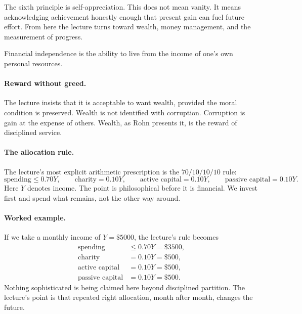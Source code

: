 The sixth principle is self-appreciation. This does not mean vanity. It means acknowledging achievement honestly enough that present gain can fuel future effort. From here the lecture turns toward wealth, money management, and the measurement of progress.

\begin{definition}
Financial independence is the ability to live from the income of one's own personal resources.
\end{definition}

\paragraph{Reward without greed.}
The lecture insists that it is acceptable to want wealth, provided the moral condition is preserved. Wealth is not identified with corruption. Corruption is gain at the expense of others. Wealth, as Rohn presents it, is the reward of disciplined service.

\paragraph{The allocation rule.}
The lecture's most explicit arithmetic prescription is the $70/10/10/10$ rule:
\begin{equation}
\text{spending} \le 0.70Y,\qquad
\text{charity}=0.10Y,\qquad
\text{active capital}=0.10Y,\qquad
\text{passive capital}=0.10Y.
\end{equation}
Here $Y$ denotes income. The point is philosophical before it is financial. We invest first and spend what remains, not the other way around.

\paragraph{Worked example.}
If we take a monthly income of $Y=\$5000$, the lecture's rule becomes
\begin{align}
\text{spending} &\le 0.70Y = \$3500, \\
\text{charity} &= 0.10Y = \$500, \\
\text{active capital} &= 0.10Y = \$500, \\
\text{passive capital} &= 0.10Y = \$500.
\end{align}
Nothing sophisticated is being claimed here beyond disciplined partition. The lecture's point is that repeated right allocation, month after month, changes the future.

